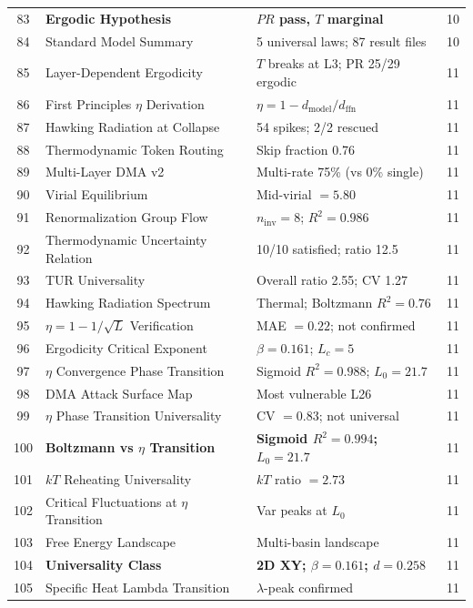 \documentclass[11pt,a4paper]{article}
\begin{document}
\begin{center}
\begin{longtable}{@{}clll@{}}
83 & \textbf{Ergodic Hypothesis}& \textbf{$PR$ pass, $T$ marginal}        & 10 \\
84 & Standard Model Summary     & 5 universal laws; 87 result files        & 10 \\
\midrule
85 & Layer-Dependent Ergodicity & $T$ breaks at L3; PR 25/29 ergodic & 11 \\
86 & First Principles $\eta$ Derivation & $\eta = 1 - d_\mathrm{model}/d_\mathrm{ffn}$ & 11 \\
87 & Hawking Radiation at Collapse & 54 spikes; 2/2 rescued & 11 \\
88 & Thermodynamic Token Routing & Skip fraction 0.76 & 11 \\
89 & Multi-Layer DMA v2 & Multi-rate 75\% (vs 0\% single) & 11 \\
90 & Virial Equilibrium & Mid-virial $= 5.80$ & 11 \\
91 & Renormalization Group Flow & $n_\mathrm{inv} = 8$; $R^2 = 0.986$ & 11 \\
92 & Thermodynamic Uncertainty Relation & 10/10 satisfied; ratio 12.5 & 11 \\
93 & TUR Universality & Overall ratio 2.55; CV 1.27 & 11 \\
94 & Hawking Radiation Spectrum & Thermal; Boltzmann $R^2 = 0.76$ & 11 \\
95 & $\eta = 1 - 1/\sqrt{L}$ Verification & MAE $= 0.22$; not confirmed & 11 \\
96 & Ergodicity Critical Exponent & $\beta = 0.161$; $L_c = 5$ & 11 \\
97 & $\eta$ Convergence Phase Transition & Sigmoid $R^2 = 0.988$; $L_0 = 21.7$ & 11 \\
98 & DMA Attack Surface Map & Most vulnerable L26 & 11 \\
99 & $\eta$ Phase Transition Universality & CV $= 0.83$; not universal & 11 \\
100 & \textbf{Boltzmann vs $\eta$ Transition} & \textbf{Sigmoid $R^2 = 0.994$; $L_0 = 21.7$} & 11 \\
101 & $kT$ Reheating Universality & $kT$ ratio $= 2.73$ & 11 \\
102 & Critical Fluctuations at $\eta$ Transition & Var peaks at $L_0$ & 11 \\
103 & Free Energy Landscape & Multi-basin landscape & 11 \\
104 & \textbf{Universality Class} & \textbf{2D XY; $\beta = 0.161$; $d = 0.258$} & 11 \\
105 & Specific Heat Lambda Transition & $\lambda$-peak confirmed & 11 \\

\end{longtable}
\end{center}
\end{document}
